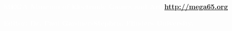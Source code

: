 
\begin{center}
\colorbox{white}{\EANisbn[SC4,ISBN=123-45-67890-12-8]}

\vspace*{\baselineskip}

\textbf{\textcolor{white}{MEGA Museum of Electronic Games and Art \url{http://mega65.org}}}

\textbf{\textcolor{white}{Editor: Dr. Paul Gardner-Stephen, Flinders University.}}

\end{center}




